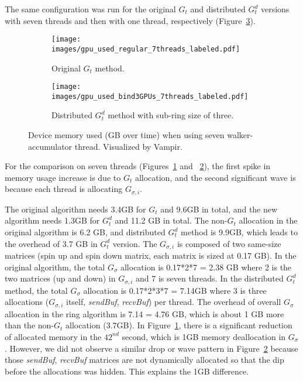 The same configuration was run for the original $G_t$ and distributed $G^d_t$ versions
with seven threads and then with one thread, respectively (Figure~\ref{fig:device_memory_used}).
%

\begin{figure}
\centering
     \begin{subfigure}[b]{\columnwidth}
         \centering
         \texttt{[image: images/gpu\_used\_regular\_7threads\_labeled.pdf]}
         \caption{Original $G_t$ method.}
         \label{fig:original_7threads}
     \end{subfigure}
     
    \begin{subfigure}[b]{\columnwidth}
         \centering
         \texttt{[image: images/gpu\_used\_bind3GPUs\_7threads\_labeled.pdf]}
         \caption{Distributed $G^d_t$ method with sub-ring size of three.}
         \label{fig:distributed_7threads}
     \end{subfigure}
     
\caption{Device memory used (GB over time) when using seven walker-accumulator thread. Visualized by Vampir.}
\label{fig:device_memory_used}
\end{figure}

For the comparison on seven threads (Figures~\ref{fig:original_7threads} and ~\ref{fig:distributed_7threads}),
the first spike in memory usage increase is due to $G_t$ allocation, and the second significant wave
is because each thread is allocating $G_{\sigma,i}$. 
%

The original algorithm needs 3.4GB for $G_t$ and 9.6GB in total,
and the new algorithm needs 1.3GB for $G^d_t$ and 11.2 GB in total. 
%
The non-$G_t$ allocation in the original algorithm is 6.2 GB, 
and distributed $G^d_t$ method is 9.9GB,
which leads to the overhead of 3.7 GB in $G^d_t$ version.
%
The $G_{\sigma,i}$ is composed of two same-size matrices 
(spin up and spin down matrix, each matrix is sized at 0.17 GB). 
%
In the original algorithm, the total $G_{\sigma}$ allocation is 
0.17*2*7 = 2.38 GB where 2 is the two matrices (up and down) in 
$G_{\sigma,i}$ and 7 is seven threads. 
%
In the distributed $G^d_t$ method, 
the total $G_{\sigma}$ allocation is 
0.17*2*3*7 = 7.14GB 
where 3 is three allocations 
($G_{\sigma,i}$ itself, \textit{sendBuf}, \textit{recvBuf}) 
per thread.
%
The overhead of overall $G_{\sigma}$ allocation 
in the ring algorithm is 7.14  = 4.76 GB, 
which is about 1 GB more than the non-$G_t$ allocation (3.7GB). 
% 
In Figure~{\ref{fig:original_7threads}}, 
there is a significant reduction of allocated memory in the $42^{nd}$ second, which is 1GB memory deallocation in $G_{\sigma}$. 
%
However, we did not observe a similar drop or wave pattern 
in Figure~{\ref{fig:distributed_7threads}} because those 
\textit{sendBuf}, \textit{recvBuf} matrices are not dynamically 
allocated so that the dip before the allocations was hidden.
%
This explains the 1GB difference.

